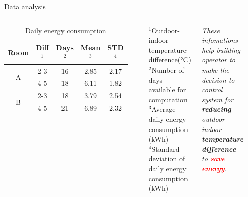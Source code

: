 \documentclass[aspectratio=169]{beamer}
\begin{document}
\begin{frame}{Data analysis}
    \begin{columns}
        \begin{table}
            \caption{Daily energy consumption}
            \begin{small}
                \begin{tabular}{c | c | c | c | c}
                    Room & Diff$^1$ & Days$^2$ & Mean$^3$ & STD$^4$ \\
                    \hline
                    \multirow{2}{*}{A}  & 2-3 & 16 & 2.85 & 2.17 \\ 
                                        & 4-5 & 18 & 6.11 & 1.82 \\
                    \hline
                    \multirow{2}{*}{B}  & 2-3 & 18 & 3.79 & 2.54 \\ 
                                        & 4-5 & 21 & 6.89 & 2.32 \\
                \end{tabular}
            \end{small}
            \scriptsize{\\
            \raggedright
                $^1$Outdoor-indoor temperature difference(°C)\\
                $^2$Number of days available for computation\\
                $^3$Average daily energy consumption (kWh)\\
                $^4$Standard deviation of daily energy consumption (kWh)\\
            }
        \end{table}
        \begin{block}{}
            \small{\textit{These infomations help building operator to make the decision to control system for \textbf{reducing} outdoor-indoor \textbf{temperature difference} to \textbf{\textcolor{red}{save energy}}.}}
        \end{block}
            \begin{figure}

\end{figure}
\end{columns}
\end{frame}
\end{document}
